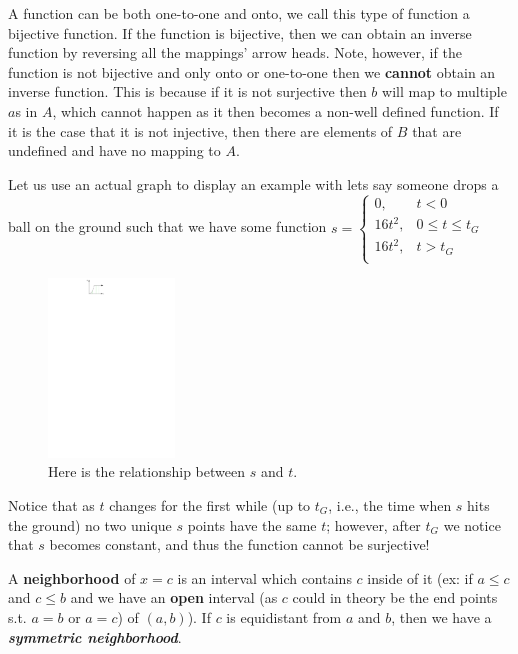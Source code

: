 \documentclass{article}
\begin{document}
A function can be both one-to-one and onto, we call this type of function a bijective function. If the function is bijective, then we can obtain an inverse function by reversing all the mappings' arrow heads. Note, however, if the function is not bijective and only onto or one-to-one then we \textbf{cannot} obtain an inverse function. This is because if it is not surjective then $b$ will map to multiple $a$s in $A$, which cannot happen as it then becomes a non-well defined function. If it is the case that it is not injective, then there are elements of $B$ that are undefined and have no mapping to $A$. 
  
Let us use an actual graph to display an example with lets say someone drops a ball on the ground such that we have some function $s=\begin{cases}
  0 ,  &t<0 \\
  16t^2 , &0\le t\le t_G \\
    16t^2 , &t>t_G \\
  
\end{cases}$

 
\begin{figure}[ht]
    \centering
 \includegraphics[width=0.3\textwidth]{./figures/st.pdf}
    \caption{Here is the relationship between $s$ and $t$.}
    \label{fig:st}
\end{figure}

Notice that as $t$ changes for the first while (up to $t_G$, i.e., the time when $s$ hits the ground) no two unique $s$ points have the same $t$; however, after $t_G$ we notice that $s$ becomes constant, and thus the function cannot be surjective! 

\begin{definition}
  A \textbf{neighborhood} of $x=c$ is an interval which contains $c$ inside of it (ex: if $a\le c$ and $c\le b$ and we have an \textbf{open} interval (as $c$ could in theory be the end points s.t. $a=b$ or $a=c$) of $(a,b)$). If $c$ is equidistant from $a$ and $b$, then we have a \textbf{\textit{symmetric neighborhood}}. 
\end{definition}
\end{document}
